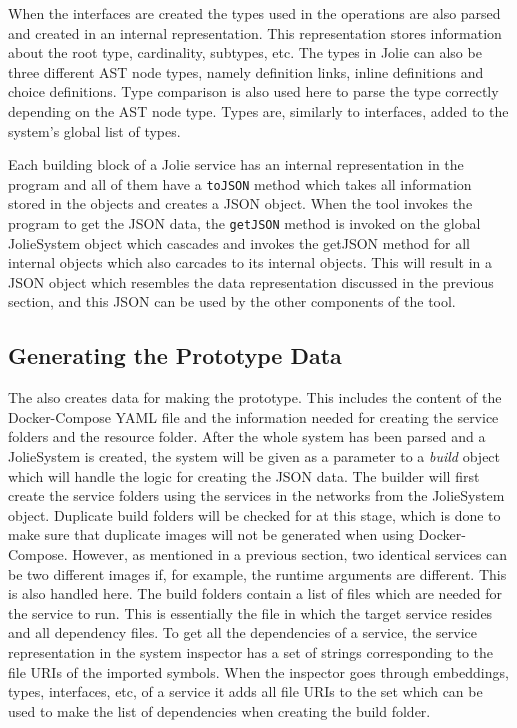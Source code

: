 When the interfaces are created the types used in the operations are also parsed and created in an internal representation.
This representation stores information about the root type, cardinality, subtypes, etc.
The types in Jolie can also be three different AST node types, namely definition links, inline definitions and choice definitions. Type comparison is also used here to parse the type correctly depending on the AST node type.
Types are, similarly to interfaces, added to the system's global list of types.

Each building block of a Jolie service has an internal representation in the \javatoolname[] program and all of them have a \texttt{toJSON} method which takes all information stored in the objects and creates a JSON object.
When the tool invokes the \javatoolname[] program to get the JSON data, the \texttt{getJSON} method is invoked on the global JolieSystem object which cascades and invokes the getJSON method for all internal objects which also carcades to its internal objects.
This will result in a JSON object which resembles the data representation discussed in the previous section, and this JSON can be used by the other components of the tool.

\subsection{Generating the Prototype Data}
The \javatoolname[] also creates data for making the prototype. This includes the content of the Docker-Compose YAML file and the information needed for creating the service folders and the resource folder.
After the whole system has been parsed and a JolieSystem is created, the system will be given as a parameter to a \emph{build} object which will handle the logic for creating the JSON data.
The builder will first create the service folders using the services in the networks from the JolieSystem object. Duplicate build folders will be checked for at this stage, which is done to make sure that duplicate images will not be generated when using Docker-Compose.
However, as mentioned in a previous section, two identical services can be two different images if, for example, the runtime arguments are different. This is also handled here.
The build folders contain a list of files which are needed for the service to run. This is essentially the file in which the target service resides and all dependency files.
To get all the dependencies of a service, the service representation in the system inspector has a set of strings corresponding to the file URIs of the imported symbols.
When the inspector goes through embeddings, types, interfaces, etc, of a service it adds all file URIs to the set which can be used to make the list of dependencies when creating the build folder.

